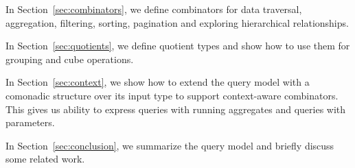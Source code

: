 In Section~\ref{sec:combinators}, we define combinators for data traversal,
aggregation, filtering, sorting, pagination and exploring hierarchical
relationships.

In Section~\ref{sec:quotients}, we define quotient types and show how to use
them for grouping and cube operations.

In Section~\ref{sec:context}, we show how to extend the query model with a
comonadic structure over its input type to support context-aware combinators.
This gives us ability to express queries with running aggregates and queries
with parameters.

In Section~\ref{sec:conclusion}, we summarize the query model and briefly
discuss some related work.

